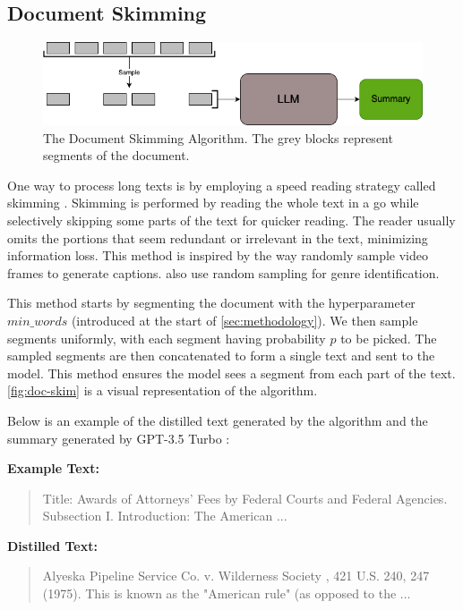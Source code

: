 	\subsection{Document Skimming}
		\label{method:skimming}

		\begin{figure}[!ht]
			\centering
			\includegraphics[width=.8\textwidth]{Images/doc-skim.png}
			\caption{The Document Skimming Algorithm. The grey blocks represent segments of the document.}
			\label{fig:doc-skim}
		\end{figure}

		One way to process long texts is by employing a speed reading strategy called skimming
		\cite{dhillon2020effect}.
		Skimming is performed by reading the whole text in a go while selectively skipping some parts
		of the text for quicker reading.
		The reader usually omits the portions that seem redundant or irrelevant in the text, minimizing
		information loss.
		This method is inspired by the way \citet{wang2024videoagent} randomly sample video frames to
		generate captions.
		\citet{worsham-kalita-2018-genre} also use random sampling for genre identification.

		This method starts by segmenting the document with the hyperparameter $min\_words$ (introduced
		at the start of \autoref{sec:methodology}).
		We then sample segments uniformly, with each segment having probability $p$ to be picked.
		The sampled segments are then concatenated to form a single text and sent to the model.
		This method ensures the model sees a segment from each part of the text.
		\autoref{fig:doc-skim} is a visual representation of the algorithm.
		
		Below is an example of the distilled text generated by the algorithm and the summary generated
		by GPT-3.5 Turbo \cite{brown2020language}:

		\noindent \textbf{Example Text:}
		\begin{quote}
			Title: Awards of Attorneys’ Fees by Federal Courts and Federal Agencies.
			Subsection I. Introduction: The American ...
		\end{quote}

		\noindent \textbf{Distilled Text:}
		\begin{quote}
			Alyeska Pipeline Service Co. v. Wilderness Society , 421 U.S. 240, 247 (1975). This is known as the "American rule" (as opposed to the ...
		\end{quote}

